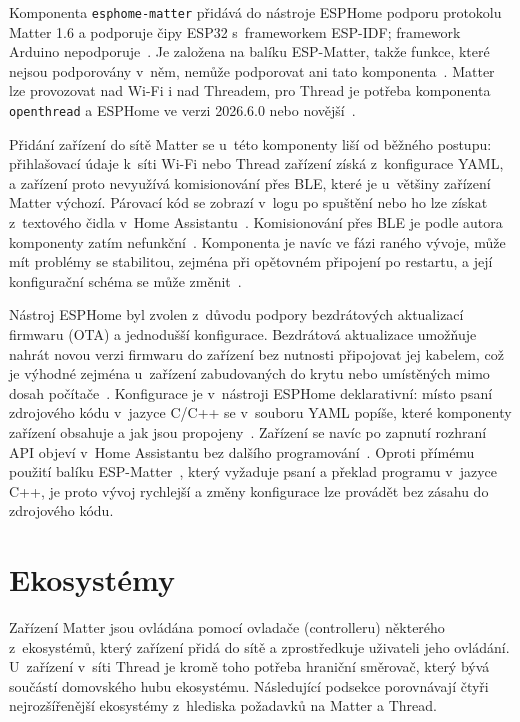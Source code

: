 Komponenta \texttt{esphome-matter} přidává do nástroje ESPHome podporu
protokolu Matter 1.6 a podporuje čipy ESP32 s~frameworkem ESP-IDF; framework
Arduino nepodporuje~\cite{esphome-matter}. Je založena na balíku ESP-Matter,
takže funkce, které nejsou podporovány v~něm, nemůže podporovat ani
tato komponenta~\cite{esphome-matter}. Matter lze provozovat nad Wi-Fi
i nad Threadem, pro Thread je potřeba komponenta \texttt{openthread}
a ESPHome ve verzi 2026.6.0 nebo novější~\cite{esphome-matter}.

Přidání zařízení do sítě Matter se u~této komponenty liší od běžného postupu:
přihlašovací údaje k~síti Wi-Fi nebo Thread zařízení získá z~konfigurace
YAML, a zařízení proto nevyužívá komisionování přes BLE, které je u~většiny
zařízení Matter výchozí. Párovací kód se zobrazí v~logu po spuštění nebo ho
lze získat z~textového čidla v~Home Assistantu~\cite{esphome-matter}.
Komisionování přes BLE je podle autora komponenty zatím nefunkční~\cite{esphome-matter}.
Komponenta je navíc ve fázi raného vývoje, může mít problémy se stabilitou,
zejména při opětovném připojení po restartu, a její konfigurační schéma se
může změnit~\cite{esphome-matter}.

Nástroj ESPHome byl zvolen z~důvodu podpory bezdrátových aktualizací firmwaru
(OTA) a jednodušší konfigurace. Bezdrátová aktualizace umožňuje nahrát novou
verzi firmwaru do zařízení bez nutnosti připojovat jej kabelem, což je
výhodné zejména u~zařízení zabudovaných do krytu nebo umístěných mimo
dosah počítače~\cite{esphome-homepage}. Konfigurace je v~nástroji ESPHome
deklarativní: místo psaní zdrojového kódu v~jazyce C/C++ se v~souboru YAML
popíše, které komponenty zařízení obsahuje a jak jsou propojeny~\cite{ha-esphome}.
Zařízení se navíc po zapnutí rozhraní API objeví v~Home Assistantu bez dalšího
programování~\cite{ha-esphome,esphome-api}. Oproti přímému použití
balíku ESP-Matter~\cite{espressif-esp-matter}, který vyžaduje psaní
a překlad programu v~jazyce C++, je proto vývoj rychlejší a změny konfigurace
lze provádět bez zásahu do zdrojového kódu.


\section{Ekosystémy}

Zařízení Matter jsou ovládána pomocí ovladače (controlleru) některého z~ekosystémů,
který zařízení přidá do sítě a zprostředkuje uživateli jeho ovládání. U~zařízení
v~síti Thread je kromě toho potřeba hraniční směrovač, který bývá součástí
domovského hubu ekosystému. Následující podsekce porovnávají čtyři
nejrozšířenější ekosystémy z~hlediska požadavků na Matter a Thread.

